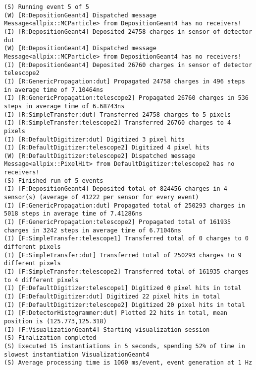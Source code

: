 \begin{lstlisting}[breaklines]
(S) Running event 5 of 5
(W) [R:DepositionGeant4] Dispatched message Message<allpix::MCParticle> from DepositionGeant4 has no receivers!
(I) [R:DepositionGeant4] Deposited 24758 charges in sensor of detector dut
(W) [R:DepositionGeant4] Dispatched message Message<allpix::MCParticle> from DepositionGeant4 has no receivers!
(I) [R:DepositionGeant4] Deposited 26760 charges in sensor of detector telescope2
(I) [R:GenericPropagation:dut] Propagated 24758 charges in 496 steps in average time of 7.10464ns
(I) [R:GenericPropagation:telescope2] Propagated 26760 charges in 536 steps in average time of 6.68743ns
(I) [R:SimpleTransfer:dut] Transferred 24758 charges to 5 pixels
(I) [R:SimpleTransfer:telescope2] Transferred 26760 charges to 4 pixels
(I) [R:DefaultDigitizer:dut] Digitized 3 pixel hits
(I) [R:DefaultDigitizer:telescope2] Digitized 4 pixel hits
(W) [R:DefaultDigitizer:telescope2] Dispatched message Message<allpix::PixelHit> from DefaultDigitizer:telescope2 has no receivers!
(S) Finished run of 5 events
(I) [F:DepositionGeant4] Deposited total of 824456 charges in 4 sensor(s) (average of 41222 per sensor for every event)
(I) [F:GenericPropagation:dut] Propagated total of 250293 charges in 5018 steps in average time of 7.41286ns
(I) [F:GenericPropagation:telescope2] Propagated total of 161935 charges in 3242 steps in average time of 6.71046ns
(I) [F:SimpleTransfer:telescope1] Transferred total of 0 charges to 0 different pixels
(I) [F:SimpleTransfer:dut] Transferred total of 250293 charges to 9 different pixels
(I) [F:SimpleTransfer:telescope2] Transferred total of 161935 charges to 4 different pixels
(I) [F:DefaultDigitizer:telescope1] Digitized 0 pixel hits in total
(I) [F:DefaultDigitizer:dut] Digitized 22 pixel hits in total
(I) [F:DefaultDigitizer:telescope2] Digitized 20 pixel hits in total
(I) [F:DetectorHistogrammer:dut] Plotted 22 hits in total, mean position is (125.773,125.318)
(I) [F:VisualizationGeant4] Starting visualization session
(S) Finalization completed
(S) Executed 15 instantiations in 5 seconds, spending 52% of time in slowest instantiation VisualizationGeant4
(S) Average processing time is 1060 ms/event, event generation at 1 Hz
\end{lstlisting}
